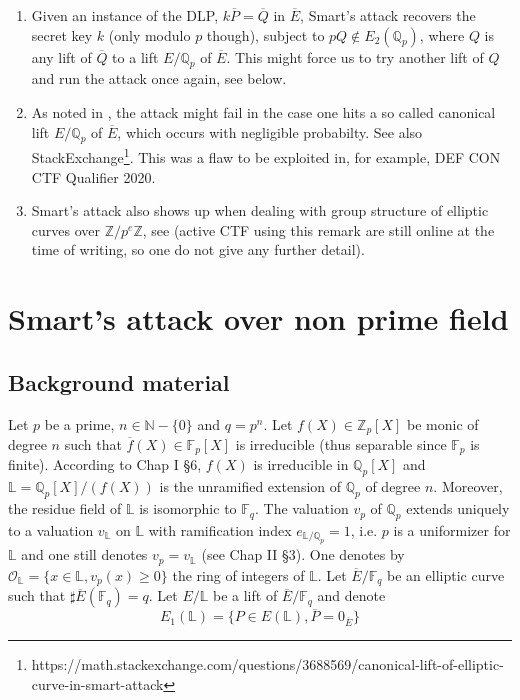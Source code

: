 \documentclass[10pt]{article}
\theoremstyle{definition}
\newcommand{\N}{\mathbb{N}}
\newcommand{\F}{\mathbb{F}}
\renewcommand{\L}{\mathbb{L}}
\newcommand{\Z}{\mathbb{Z}}
\newcommand{\Q}{\mathbb{Q}}
\begin{document}
\begin{enumerate}
\item Given an instance of the DLP, $k\overline{P} = \overline{Q}$ in $\overline{E}$, Smart's attack recovers the secret key $k$ (only modulo $p$ though), subject to $pQ \notin E_2(\Q_p)$, where $Q$ is any lift of $\overline{Q}$ to a lift $E/\Q_p$ of $\overline{E}$.
This might force us to try another lift of $Q$ and run the attack once again, see below. 
\item As noted in \cite{Sma99}, the attack might fail in the case one hits a so called canonical lift $E/\Q_p$ of $\overline{E}$, which occurs with negligible probabilty. 
See also StackExchange\footnote{https://math.stackexchange.com/questions/3688569/canonical-lift-of-elliptic-curve-in-smart-attack}.
This was a flaw to be exploited in, for example, DEF CON CTF Qualifier 2020.
\item Smart's attack also shows up when dealing with group structure of elliptic curves over $\Z/p^e\Z$, see \cite{Sala_2024} (active CTF using this remark are still online at the time of writing, so one do not give any further detail).
\end{enumerate} 

\section{Smart's attack over non prime field}

\subsection{Background material}

Let $p$ be a prime, $n \in \N - \lbrace 0 \rbrace$ and $q = p^n$.
Let $f(X) \in \Z_p[X]$ be monic of degree $n$ such that $\overline{f}(X) \in \F_p[X] $ is irreducible (thus separable since $\F_p$ is finite).
According to \cite{Serre-CL} Chap I \S 6, $f(X)$ is irreducible in $\Q_p[X]$ and $\L = \Q_p[X]/(f(X))$ is the unramified extension of $\Q_p$ of degree $n$.
Moreover, the residue field of $\L$ is isomorphic to $\F_q$.
The valuation $v_p$ of $\Q_p$ extends uniquely to a valuation $v_{\L}$ on $\L$ with ramification index $e_{\L/\Q_p} = 1$, i.e. $p$ is a uniformizer for $\L$ and one still denotes $v_p = v_{\L}$ (see \cite{Serre-CL} Chap II \S 3).
One denotes by $\mathcal{O}_{\L} = \lbrace x \in \L , v_p(x)  \geq 0 \rbrace$ the ring of integers of $\L$.
Let $\overline{E}/\F_q$ be an elliptic curve such that $\sharp \overline{E}(\F_q) = q$.
Let $E/\L$ be a lift of $\overline{E}/\F_q$ and denote
\[
E_1(\L) = \lbrace P \in E(\L), \overline{P} = 0_{\overline{E}} \rbrace 
\]
\end{document}
